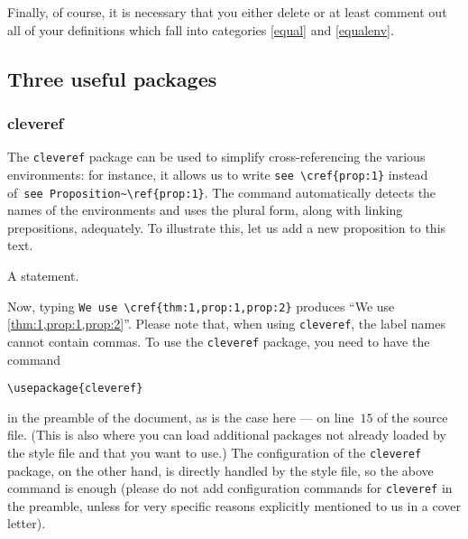 \documentclass[IGT,Unicode]{cedram}
\begin{document}
    Finally, of course, it is necessary that you either delete or at
    least comment out all of your definitions which fall into categories
    \ref{equal} and \ref{equalenv}.

\subsection{Three useful packages}

\subsubsection{cleveref}\label{subsubsub:cleveref}
The \verb|cleveref| package can be used to simplify cross-referencing the various environments: for instance,
it allows us to write \verb|see \cref{prop:1}| instead of~\verb|see Proposition~\ref{prop:1}|.
The command automatically detects the names of the environments and uses the plural form, along with linking
prepositions, adequately. To illustrate this, let us add a new proposition to this text.
\begin{prop}\label{prop:2}
 A statement. 
\end{prop}
Now, typing \verb|We use \cref{thm:1,prop:1,prop:2}| produces ``We use \cref{thm:1,prop:1,prop:2}''.
Please note that, when using \verb|cleveref|, the label names cannot contain commas.
To use the \verb|cleveref| package, you need to have the command

\verb|\usepackage{cleveref}|

\noindent
in the preamble of the document, as is the case here --- on line~$15$ of the source file.  (This is also where
you can load additional packages not already loaded by the style file and that you want to use.) The
configuration of the \verb|cleveref| package, on the other hand, is directly handled by the style file, so the
above command is enough (please do not add configuration commands for \verb|cleveref| in the preamble, unless
for very specific reasons explicitly mentioned to us in a cover letter).
\end{document}
